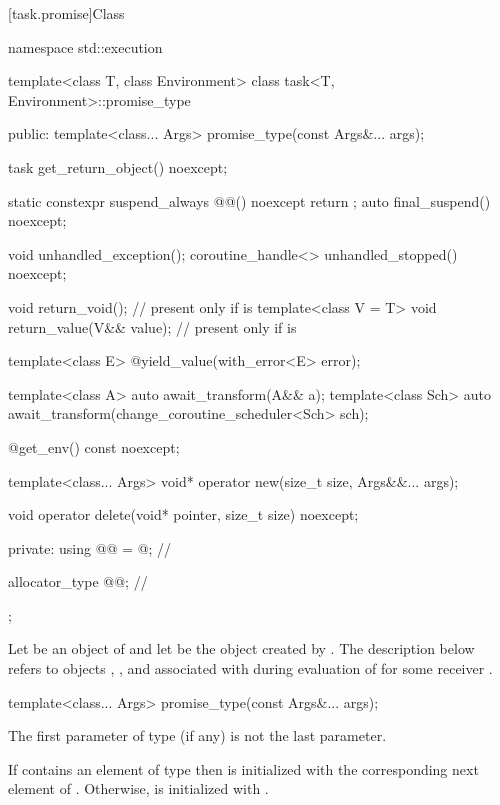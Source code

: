 [task.promise]{Class }

\begin{codeblock}
namespace std::execution {
  template<class T, class Environment>
  class task<T, Environment>::promise_type {
  public:
    template<class... Args>
      promise_type(const Args&... args);

    task get_return_object() noexcept;

    static constexpr suspend_always @@() noexcept { return {}; }
    auto final_suspend() noexcept;

    void unhandled_exception();
    coroutine_handle<> unhandled_stopped() noexcept;

    void return_void();                 // present only if  is 
    template<class V = T>
      void return_value(V&& value);     // present only if  is 

    template<class E>
      @\unspec@ yield_value(with_error<E> error);

    template<class A>
      auto await_transform(A&& a);
    template<class Sch>
      auto await_transform(change_coroutine_scheduler<Sch> sch);

    @\unspec@ get_env() const noexcept;

    template<class... Args>
      void* operator new(size_t size, Args&&... args);

    void operator delete(void* pointer, size_t size) noexcept;

  private:
    using @@ = @\seebelownc@;    // \expos

    allocator_type    @@;            // \expos
  };
}
\end{codeblock}

\pnum
Let  be an object of 
and let  be the  object
created by .
The description below
refers to objects ,
,
and 
associated with 
during evaluation of 
for some receiver .

%
\begin{itemdecl}
template<class... Args>
  promise_type(const Args&... args);
\end{itemdecl}
\begin{itemdescr}
\pnum
\mandates
The first parameter of type  (if any) is not
the last parameter.

\pnum
\effects
If  contains an element of type 
then  is initialized with the corresponding next
element of .
Otherwise,  is initialized with .
\end{itemdescr}

